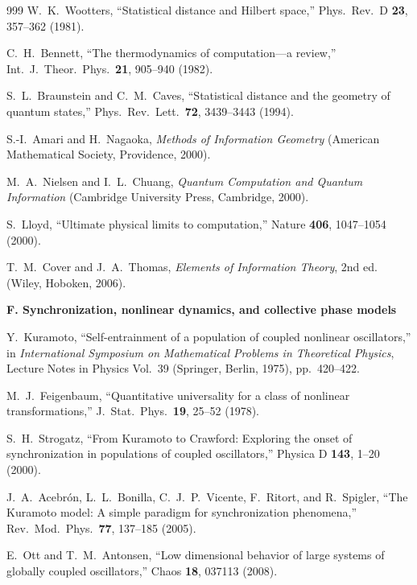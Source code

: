 \begin{thebibliography}{999}
W.~K.~Wootters,
``Statistical distance and Hilbert space,''
Phys.\ Rev.\ D \textbf{23}, 357--362 (1981).

C.~H.~Bennett,
``The thermodynamics of computation---a review,''
Int.\ J.\ Theor.\ Phys.\ \textbf{21}, 905--940 (1982).

S.~L.~Braunstein and C.~M.~Caves,
``Statistical distance and the geometry of quantum states,''
Phys.\ Rev.\ Lett.\ \textbf{72}, 3439--3443 (1994).

S.-I.~Amari and H.~Nagaoka,
\emph{Methods of Information Geometry}
(American Mathematical Society, Providence, 2000).

M.~A.~Nielsen and I.~L.~Chuang,
\emph{Quantum Computation and Quantum Information}
(Cambridge University Press, Cambridge, 2000).

S.~Lloyd,
``Ultimate physical limits to computation,''
Nature \textbf{406}, 1047--1054 (2000).

T.~M.~Cover and J.~A.~Thomas,
\emph{Elements of Information Theory}, 2nd ed.
(Wiley, Hoboken, 2006).

\item[]\textbf{F. Synchronization, nonlinear dynamics, and collective phase models}

Y.~Kuramoto,
``Self-entrainment of a population of coupled nonlinear oscillators,'' in
\emph{International Symposium on Mathematical Problems in Theoretical Physics},
Lecture Notes in Physics Vol.~39 (Springer, Berlin, 1975), pp.~420--422.

M.~J.~Feigenbaum,
``Quantitative universality for a class of nonlinear transformations,''
J.\ Stat.\ Phys.\ \textbf{19}, 25--52 (1978).

S.~H.~Strogatz,
``From Kuramoto to Crawford: Exploring the onset of synchronization in
populations of coupled oscillators,''
Physica D \textbf{143}, 1--20 (2000).

J.~A.~Acebr\'on, L.~L.~Bonilla, C.~J.~P.~Vicente, F.~Ritort, and R.~Spigler,
``The Kuramoto model: A simple paradigm for synchronization phenomena,''
Rev.\ Mod.\ Phys.\ \textbf{77}, 137--185 (2005).

E.~Ott and T.~M.~Antonsen,
``Low dimensional behavior of large systems of globally coupled oscillators,''
Chaos \textbf{18}, 037113 (2008).


\end{thebibliography}
